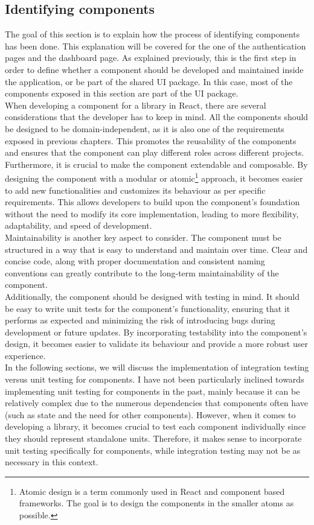 \documentclass[./memory.tex]{subfiles}
\begin{document}
\subsection{Identifying components}
The goal of this section is to explain how the process of identifying components
has been done. This explanation will be covered for the one of the
authentication pages and the dashboard page. As explained previously, this is
the first step in order to define whether a component should be developed and
maintained inside the application, or be part of the shared UI package. In this
case, most of the components exposed in this section are part of the UI package.
\\[8pt]
When developing a component for a library in React, there are several
considerations that the developer has to keep in mind. All the components should
be designed to be domain-independent, as it is also one of the requirements
exposed in previous chapters. This promotes the reusability of the components
and ensures that the component can play different roles across different
projects.
\\
Furthermore, it is crucial to make the component extendable and composable. By
designing the component with a modular or atomic\footnote{Atomic design is a
	term commonly used in React and component based frameworks. The goal is to
	design the components in the smaller atoms as possible.} approach, it becomes
easier to add new functionalities and customizes its behaviour as per specific
requirements. This allows developers to build upon the component's foundation
without the need to modify its core implementation, leading to more flexibility,
adaptability, and speed of development.
\\
Maintainability is another key aspect to consider. The component must be
structured in a way that is easy to understand and maintain over time. Clear and
concise code, along with proper documentation and consistent naming conventions
can greatly contribute to the long-term maintainability of the component.
\\
Additionally, the component should be designed with testing in mind. It should
be easy to write unit tests for the component's functionality, ensuring that it
performs as expected and minimizing the risk of introducing bugs during
development or future updates. By incorporating testability into the component's
design, it becomes easier to validate its behaviour and provide a more robust
user experience.
\\[8pt]
In the following sections, we will discuss the implementation of integration
testing versus unit testing for components. I have not been particularly
inclined towards implementing unit testing for components in the past, mainly
because it can be relatively complex due to the numerous dependencies that
components often have (such as state and the need for other components).
However, when it comes to developing a library, it becomes crucial to test each
component individually since they should represent standalone units. Therefore,
it makes sense to incorporate unit testing specifically for components, while
integration testing may not be as necessary in this context.
\end{document}

